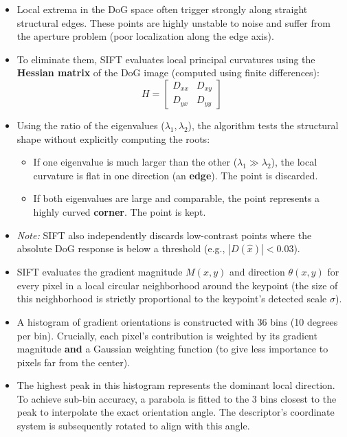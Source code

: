{
\begin{itemize}
    \item Local extrema in the DoG space often trigger strongly along straight structural edges. These points are highly unstable to noise and suffer from the aperture problem (poor localization along the edge axis).
    \item To eliminate them, SIFT evaluates local principal curvatures using the \textbf{Hessian matrix} of the DoG image (computed using finite differences): 
    $$H = \begin{bmatrix} D_{xx} & D_{xy} \\ D_{yx} & D_{yy} \end{bmatrix}$$
    \item Using the ratio of the eigenvalues ($\lambda_1, \lambda_2$), the algorithm tests the structural shape without explicitly computing the roots:
    \begin{itemize}
        \item If one eigenvalue is much larger than the other ($\lambda_1 \gg \lambda_2$), the local curvature is flat in one direction (an \textbf{edge}). The point is discarded.
        \item If both eigenvalues are large and comparable, the point represents a highly curved \textbf{corner}. The point is kept.
    \end{itemize}
    \item \textit{Note:} SIFT also independently discards low-contrast points where the absolute DoG response is below a threshold (e.g., $|D(\hat{x})| < 0.03$).
\end{itemize}
}

{
\begin{itemize}
    \item SIFT evaluates the gradient magnitude $M(x,y)$ and direction $\theta(x,y)$ for every pixel in a local circular neighborhood around the keypoint (the size of this neighborhood is strictly proportional to the keypoint's detected scale $\sigma$).
    \item A histogram of gradient orientations is constructed with 36 bins (10 degrees per bin). Crucially, each pixel's contribution is weighted by its gradient magnitude \textbf{and} a Gaussian weighting function (to give less importance to pixels far from the center).
    \item The highest peak in this histogram represents the dominant local direction. To achieve sub-bin accuracy, a parabola is fitted to the 3 bins closest to the peak to interpolate the exact orientation angle. The descriptor's coordinate system is subsequently rotated to align with this angle.
\end{itemize}
}

